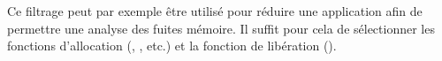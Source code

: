   Ce filtrage peut par exemple être utilisé pour réduire une application
  afin de permettre une analyse des fuites mémoire.
  Il suffit pour cela de sélectionner les fonctions d'allocation (,
  , etc.) et la fonction de libération ().\\



